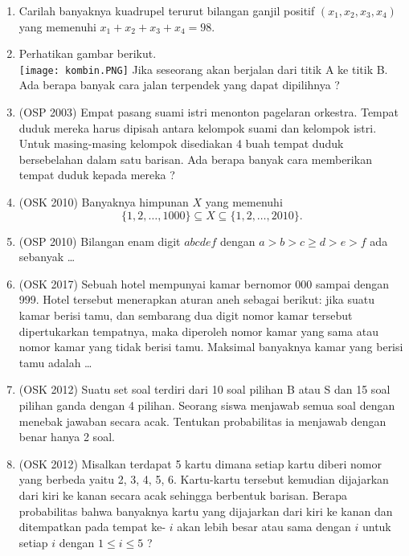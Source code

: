 \documentclass[11pt]{scrartcl}
\begin{document}
\begin{enumerate}
            \item Carilah banyaknya kuadrupel terurut bilangan ganjil positif $(x_1, x_2, x_3, x_4)$ yang memenuhi
        $x_1 + x_2 + x_3 + x_4 = 98$.
        
            \item Perhatikan gambar berikut.\\
            \texttt{[image: kombin.PNG]}
            Jika seseorang akan berjalan dari titik A ke titik B. Ada berapa banyak cara jalan terpendek 
        yang dapat dipilihnya ?
            
            \item (OSP 2003) Empat pasang suami istri menonton pagelaran orkestra. Tempat duduk mereka harus 
        dipisah antara kelompok suami dan kelompok istri. Untuk masing-masing kelompok disediakan 4
        buah tempat duduk bersebelahan dalam satu barisan. Ada berapa banyak cara memberikan 
        tempat duduk kepada mereka ?
        
            \item (OSK 2010) Banyaknya himpunan $X$ yang memenuhi 
        $$\{1,2,\dots,1000\} \subseteq X \subseteq \{1,2,\dots,2010\}.$$
        
            \item (OSP 2010) Bilangan enam digit $abcdef$ dengan $a > b > c \ge d > e > f$ ada sebanyak \dots
            
            \item (OSK 2017)
        	Sebuah hotel mempunyai kamar bernomor 000 sampai dengan 999. Hotel tersebut menerapkan
        aturan aneh sebagai berikut: jika suatu kamar berisi tamu, dan sembarang dua digit nomor kamar
        tersebut dipertukarkan tempatnya, maka diperoleh nomor kamar yang sama atau nomor kamar
        yang tidak berisi tamu. Maksimal banyaknya kamar yang berisi tamu adalah \dots
        
            \item (OSK 2012) Suatu set soal terdiri dari 10 soal pilihan B atau S dan 15 soal pilihan ganda dengan 4 pilihan. Seorang siswa menjawab semua soal dengan menebak jawaban secara acak. Tentukan probabilitas ia menjawab dengan benar hanya 2 soal.
            
            \item (OSK 2012) Misalkan terdapat 5 kartu dimana setiap kartu diberi nomor yang berbeda yaitu 2, 3, 4, 5, 6. Kartu-kartu tersebut kemudian dijajarkan dari kiri ke kanan secara acak sehingga berbentuk barisan. Berapa probabilitas bahwa banyaknya kartu yang dijajarkan dari kiri ke kanan dan ditempatkan pada tempat ke- $i$ akan lebih besar atau sama dengan $i$ untuk setiap $i$ dengan $1 \le i \le 5$ ?
            

\end{enumerate}
\end{document}
